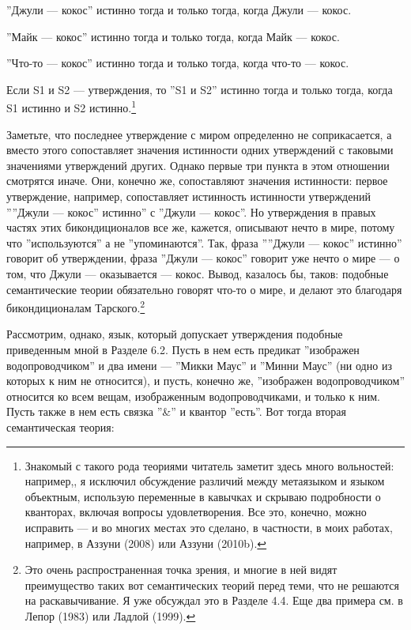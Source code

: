 \documentclass[11pt]{book}
\begin{document}
\smallskip

''Джули --- кокос'' истинно тогда и только тогда, когда Джули --- кокос.

''Майк --- кокос'' истинно тогда и только тогда, когда Майк --- кокос.

''Что-то --- кокос'' истинно тогда и только тогда, когда что-то --- кокос.

Если S1 и S2 --- утверждения, то ''S1 и S2'' истинно тогда и только тогда, когда S1 истинно и S2 истинно.\footnote{Знакомый с такого рода теориями читатель заметит здесь много вольностей: например,, я исключил обсуждение различий между метаязыком и языком объектным, использую переменные в кавычках и скрываю подробности о кванторах, включая вопросы удовлетворения. Все это, конечно, можно исправить --- и во многих местах это сделано, в частности, в моих работах, например, в Аззуни (2008) или Аззуни (2010b).}

\smallskip

Заметьте, что последнее утверждение с миром определенно не соприкасается, а вместо этого сопоставляет значения истинности одних утверждений с таковыми значениями утверждений других. Однако первые три пункта в этом отношении смотрятся иначе. Они, конечно же, сопоставляют значения истинности: первое утверждение, например, сопоставляет истинность истинности утверждений ''''Джули --- кокос'' истинно'' с ''Джули --- кокос''. Но утверждения в правых частях этих бикондиционалов все же, кажется, описывают нечто в мире, потому что ''используются'' а не ''упоминаются''. Так, фраза ''''Джули --- кокос'' истинно'' говорит об утверждении, фраза ''Джули --- кокос'' говорит уже нечто о мире --- о том, что Джули --- оказывается --- кокос. Вывод, казалось бы, таков: подобные семантические теории обязательно говорят что-то о мире, и делают это благодаря бикондиционалам Тарского.\footnote{Это очень распространенная точка зрения, и многие в ней видят преимущество таких вот семантических теорий перед теми, что не решаются на раскавычивание. Я уже обсуждал это в Разделе 4.4. Еще два примера см. в Лепор (1983) или Ладлой (1999).}

Рассмотрим, однако, язык, который допускает утверждения подобные приведенным мной в Разделе 6.2. Пусть в нем есть предикат ''изображен водопроводчиком'' и два имени --- ''Микки Маус'' и ''Минни Маус'' (ни одно из которых к ним не относится), и пусть, конечно же, ''изображен водопроводчиком'' относится ко всем вещам, изображенным водопроводчиками, и только к ним. Пусть также в нем есть связка ''\&'' и квантор ''есть''. Вот тогда вторая семантическая теория:
\end{document}
